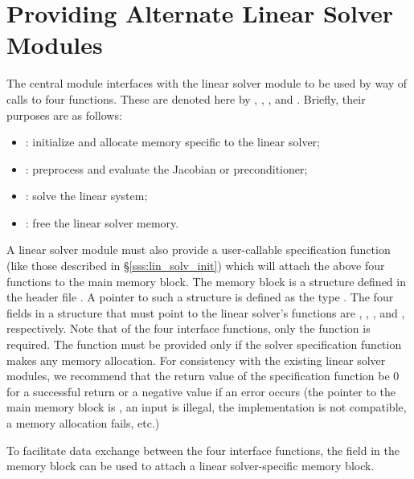 \chapter{Providing Alternate Linear Solver Modules}\label{s:new_linsolv}
The central {\cvodes} module interfaces with the linear solver module to be
used by way of calls to four functions.  These are denoted here by 
, , , and .
Briefly, their purposes are as follows:
\begin{itemize}
\item {}: initialize and allocate memory specific to the
  linear solver;
\item {}: preprocess and evaluate the Jacobian or preconditioner;
\item {}: solve the linear system;
\item {}: free the linear solver memory.
\end{itemize}
A linear solver module must also provide a user-callable specification function
(like those described in \S\ref{sss:lin_solv_init}) which will attach the above four 
functions to the main {\cvodes} memory block. 
The {\cvodes} memory block is a structure defined in the header file . 
A pointer to such a structure is defined as the type . 
The four fields in a  structure that must point to the linear solver's 
functions are , , , and , respectively.
Note that of the four interface functions, only the  function is required. 
The  function must be provided only if the solver specification function
makes any memory allocation.
For consistency with the existing {\cvodes} linear solver modules, we recommend that the 
return value of the specification function be 0 for a successful return or a negative value 
if an error occurs (the pointer to the main {\cvodes} memory block is , 
an input is illegal, the {\nvector} implementation is not compatible, a memory allocation 
fails, etc.)

To facilitate data exchange between the four interface functions, the field 
in the {\cvodes} memory block can be used to attach a linear solver-specific memory
block.


